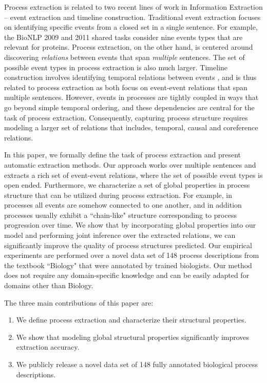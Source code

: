 Process extraction is related to two recent lines of work in Information Extraction -- event extraction and timeline construction.
Traditional event extraction focuses on identifying specific events from a closed set in a single sentence. 
For example, the BioNLP 2009 and 2011 shared tasks \cite{kim09,kim11} consider nine events types that are relevant for proteins.
Process extraction, on the other hand, is centered around discovering \emph{relations} between events that span \emph{multiple} sentences. The set of possible event types in process extraction is also much larger. Timeline construction involves identifying temporal relations between events \cite{Do12,Mcclosky12,DSouzaNg:13a}, and is thus related to process extraction as both focus on event-event relations that span multiple sentences. However, events in processes are tightly coupled in ways that go beyond simple temporal ordering, and these dependencies are central for the task of process extraction. Consequently, capturing process structure requires modeling a larger set of relations that includes, temporal, causal and coreference relations.


In this paper, we formally define the task of process extraction and present automatic extraction methods. 
Our approach works over multiple sentences and extracts a rich set of event-event relations, where the set of possible event types is open ended. 
Furthermore, we characterize a set of global properties in process structure that can be utilized during process extraction. 
For example, in processes all events are somehow connected to one another, and in addition processes usually exhibit a ``chain-like" structure corresponding to process progression over time. 
We show that by incorporating global properties into our model and performing joint inference over the extracted relations, we can significantly improve the quality of process structures predicted.  
Our empirical experiments are performed over a novel data set of 148 process descriptions from the textbook ``Biology" \cite{CampbellReece} that were annotated by trained biologists. Our method does not require any domain-specific knowledge and can be easily adapted for domains other than Biology.

The three main contributions of this paper are:
\begin{enumerate}[itemsep=0pt,topsep=0pt] 
\item We define process extraction and characterize their structural properties.
\item We show that modeling global structural properties significantly improves extraction accuracy.
\item  We publicly release a novel data set of 148 fully annotated biological process descriptions.
\end{enumerate}
